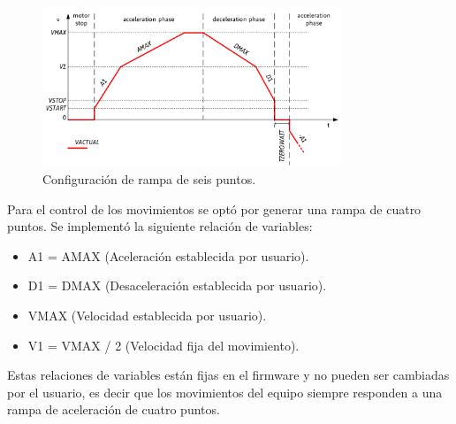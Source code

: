 \begin{figure}[h!]
	\centering
	\includegraphics[width=0.8\textwidth]{./Figures/rampa_1.png}
	\caption{Configuración de rampa de seis puntos.}
	\label{fig:rampa}
\end{figure}


%
%
%

Para el control de los movimientos se optó por generar una rampa de cuatro puntos. Se implementó la siguiente relación de variables:

\begin{itemize}
\item A1 = AMAX  (Aceleración establecida por usuario).
\item D1 = DMAX  (Desaceleración establecida por usuario).
\item VMAX 	  (Velocidad establecida por usuario).
\item V1 = VMAX / 2 (Velocidad fija del movimiento).

\end{itemize}

Estas relaciones de variables están fijas en el firmware y no pueden ser cambiadas por el usuario, es decir que los movimientos del equipo siempre responden a una rampa de aceleración de cuatro puntos.


